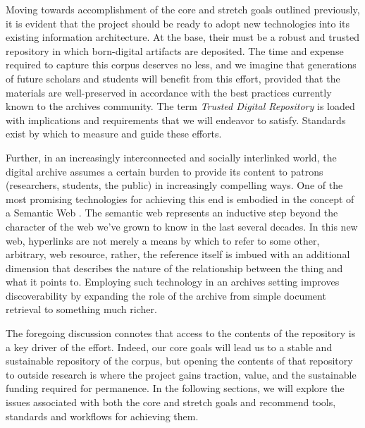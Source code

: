 Moving towards accomplishment of the core and stretch goals outlined previously, it is evident that the project should be ready to adopt new technologies into its existing information architecture. At the base, their must be a robust and trusted repository in which born-digital artifacts are deposited. The time and expense required to capture this corpus deserves no less, and we imagine that generations of future scholars and students will benefit from this effort, provided that the materials are well-preserved in accordance with the best practices currently known to the archives community. The term \emph{Trusted Digital Repository} is loaded with implications and requirements that we will endeavor to satisfy. Standards exist  by which to measure and guide these efforts.

Further, in an increasingly interconnected and socially interlinked world, the digital archive assumes a certain burden to provide its content to patrons (researchers, students, the public) in increasingly compelling ways. One of the most promising technologies for achieving this end is embodied in the concept of a Semantic Web \needcite[TBL]. The semantic web represents an inductive step beyond the character of the web we've grown to know in the last several decades. In this new web, hyperlinks are not merely a means by which to refer to some other, arbitrary, web resource, rather, the reference itself is imbued with an additional dimension that describes the nature of the relationship between the thing and what it points to. \needcite[Barthes?] Employing such technology in an archives setting improves discoverability by expanding the role of the archive from simple document retrieval to something much richer.

The foregoing discussion connotes that access to the contents of the repository is a key driver of the effort. Indeed, our core goals will lead us to a stable and sustainable repository of the corpus, but opening the contents of that repository to outside research is where the project gains traction, value, and the sustainable funding required for permanence. In the following sections, we will explore the issues associated with both the core and stretch goals and recommend tools, standards and workflows for achieving them.